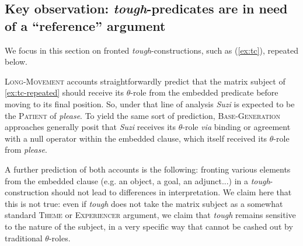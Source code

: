 \documentclass[11pt]{article}
\begin{document}
\subsection{Key observation: \textit{tough}-predicates are in need of a ``reference'' argument}\label{sec:reference-argument}
We focus in this section on fronted \textit{tough}-constructions, such as (\ref{ex:tc}), repeated below.
\begin{exe}
	\label{ex:tc-repeated}
\end{exe}
\textsc{Long-Movement} accounts straightforwardly predict that the matrix subject of \ref{ex:tc-repeated} should receive its $\theta$-role from the embedded predicate before moving to its final position. So, under that line of analysis \textit{Suzi} is expected to be the \textsc{Patient} of \textit{please}. To yield the same sort of prediction, \textsc{Base-Generation} approaches generally posit that \textit{Suzi} receives its $\theta$-role \textit{via} binding or agreement with a null operator within the embedded clause, which itself received its $\theta$-role from \textit{please}.

A further prediction of both accounts is the following: fronting various elements from the embedded clause (e.g. an object, a goal, an adjunct...) in a \textit{tough}-construction should not lead to differences in interpretation. We claim here that this is not true: even if \textit{tough} does not take the matrix subject as a somewhat standard \textsc{Theme} or \textsc{Experiencer} argument, we claim that \textit{tough} remains sensitive to the nature of the subject, in a very specific way that cannot be cashed out by traditional $\theta$-roles.
\end{document}
